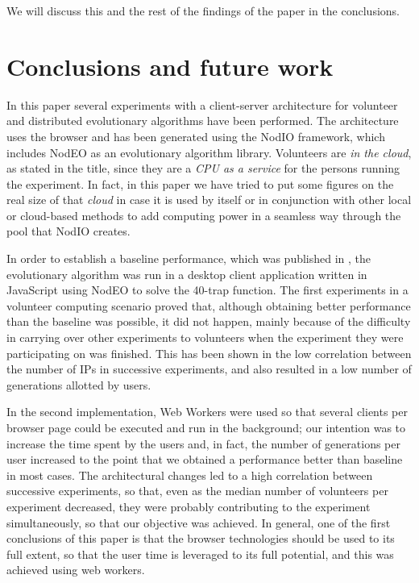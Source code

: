 \documentclass{sig-alternate}
\begin{document}
We will discuss this and the rest of the findings of the paper in the
conclusions. 

\section{Conclusions and future work}
\label{sec:conclusion}

In this paper several experiments with a client-server architecture for volunteer and distributed
evolutionary algorithms have been performed. The architecture uses the
browser and has been generated using the {\sf
  NodIO} framework, which includes  {\sf NodEO} as an evolutionary
algorithm library. Volunteers are {\em in the cloud}, as stated in the
title, 
since they are a {\em CPU as a service} for the persons running the
experiment. In fact, in this paper we have tried to put some figures
on the real size of that {\em cloud} in case it is used by itself or
in conjunction with other local or 
cloud-based methods to add computing power in a seamless way through
the pool that {\sf NodIO} creates. 

In order to establish a baseline performance, which was published in
\cite{2016arXiv160101607Manom}, the evolutionary algorithm was run in a desktop client application written in JavaScript
using NodEO to solve the 40-trap function. The first experiments in a
volunteer computing scenario proved that, although obtaining better performance than the
baseline  was possible, it did not happen, mainly because of the
difficulty in carrying over other experiments to volunteers when the
experiment they were participating on was finished. This has been shown in the low
correlation between the number of IPs in successive experiments, and
also resulted in a low number of generations allotted by users.  

In the second implementation, Web Workers
were used so that several clients per browser page could be executed and
run in the background; our intention was to increase the time spent by
the users and, in fact, the number of generations per
user increased to the point that we obtained a performance better than
baseline in most cases. The architectural changes led to a high correlation
between successive experiments, so that, even as the median number of
volunteers per experiment decreased, they were probably contributing
to the experiment simultaneously, so that our objective was
achieved. In general, one of the first conclusions of this paper is
that the browser technologies should be used to its full extent, so
that the user time is leveraged to its full potential, and this was
achieved using web workers. 
\end{document}
